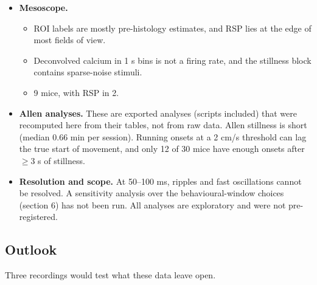 \documentclass[10pt,a4paper]{article}
\begin{document}
\begin{itemize}
\item \textbf{Mesoscope.} 
\begin{itemize}
\item ROI labels are mostly pre-histology estimates, and RSP lies at the edge of most fields of view.
\item Deconvolved calcium in 1 s bins is not a firing rate, and the stillness block contains sparse-noise stimuli.
\item 9 mice, with RSP in 2.
\end{itemize}
\item \textbf{Allen analyses.} These are exported analyses (scripts included) that were recomputed here from their tables, not from raw data. Allen stillness is short (median 0.66 min per session). Running onsets at a 2 cm/s threshold can lag the true start of movement, and only 12 of 30 mice have enough onsets after $\geq$3 s of stillness.
\item \textbf{Resolution and scope.} At 50--100 ms, ripples and fast oscillations cannot be resolved. A sensitivity analysis over the behavioural-window choices (section 6) has not been run. All analyses are exploratory and were not pre-registered.
\end{itemize}
\subsection{Outlook}
Three recordings would test what these data leave open.
\end{document}
